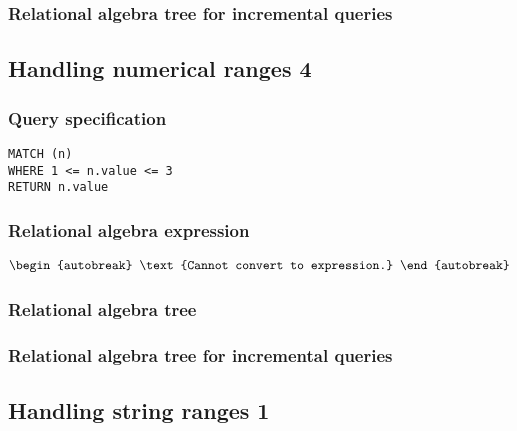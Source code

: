 
\subsubsection*{Relational algebra tree for incremental queries}


\subsection{Handling numerical ranges 4}

\subsubsection*{Query specification}

\begin{lstlisting}
MATCH (n)
WHERE 1 <= n.value <= 3
RETURN n.value
\end{lstlisting}

\subsubsection*{Relational algebra expression}

\begin{align*}
\begin{autobreak}
\text{Cannot convert to expression.}
\end{autobreak}
\end{align*}

\subsubsection*{Relational algebra tree}


\subsubsection*{Relational algebra tree for incremental queries}


\subsection{Handling string ranges 1}

